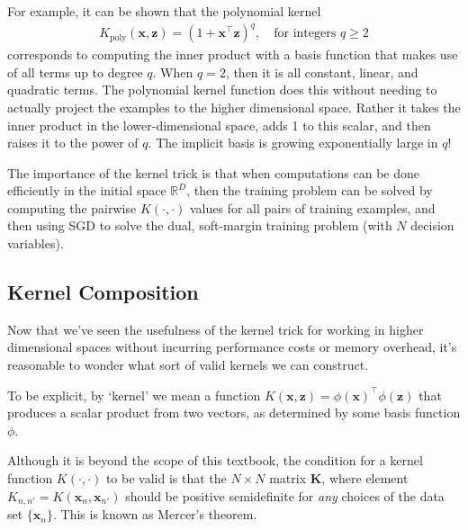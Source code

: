         For example, it can be shown that the polynomial kernel
        \begin{align}
          K_{\mathrm{poly}}(\mathbf{x},\mathbf{z})=(1+\mathbf{x}^\top \mathbf{z})^q, \quad \mbox{for integers $q\geq 2$}
        \end{align}
        corresponds to computing the inner product with a basis function that makes use of all terms up to degree $q$. When $q=2$, then it is all constant, linear, and quadratic terms. The polynomial kernel function does this without needing to actually project the examples to the higher dimensional space. Rather it takes the inner product in the lower-dimensional space, adds 1 to this scalar, and then raises it to the power of $q$. The implicit basis is growing exponentially large in $q$! 
        
   

The importance of the kernel trick is that when computations can be done efficiently in the initial space $\mathbb{R}^D$, then the training problem can be solved by computing the pairwise $K(\cdot,\cdot)$ values for all pairs of training examples, and then using SGD to solve the dual, soft-margin training problem (with $N$ decision variables).


\subsection{Kernel Composition}

Now that we've seen the usefulness of the kernel trick for working in higher dimensional spaces without incurring performance costs or memory overhead, it's reasonable to wonder what sort of valid kernels we can construct.

To be explicit, by `kernel' we mean a function $K(\textbf{x}, \textbf{z}) = \phi(\textbf{x})^\top \phi(\textbf{z})$ that produces a scalar product from two vectors, as determined by some basis function $\phi$.

Although it is beyond the scope of this textbook, the condition for a kernel function $K(\cdot,\cdot)$ to be valid is that the $N\times N$ matrix $\mathbf{K}$, where element $K_{n,n'}= K(\textbf{x}_{n}, \textbf{x}_{n'})$ should be positive semidefinite for {\em any} choices of the data set $\{ \textbf{x}_{n} \}$. This is known as Mercer's theorem.

